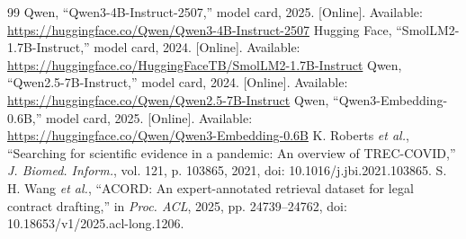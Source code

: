 \documentclass[conference]{IEEEtran}
\begin{document}
\begin{thebibliography}{99}
 Qwen, ``Qwen3-4B-Instruct-2507,'' model card, 2025. [Online]. Available: \url{https://huggingface.co/Qwen/Qwen3-4B-Instruct-2507}
 Hugging Face, ``SmolLM2-1.7B-Instruct,'' model card, 2024. [Online]. Available: \url{https://huggingface.co/HuggingFaceTB/SmolLM2-1.7B-Instruct}
 Qwen, ``Qwen2.5-7B-Instruct,'' model card, 2024. [Online]. Available: \url{https://huggingface.co/Qwen/Qwen2.5-7B-Instruct}
 Qwen, ``Qwen3-Embedding-0.6B,'' model card, 2025. [Online]. Available: \url{https://huggingface.co/Qwen/Qwen3-Embedding-0.6B}
 K. Roberts \emph{et al.}, ``Searching for scientific evidence in a pandemic: An overview of TREC-COVID,'' \emph{J. Biomed. Inform.}, vol. 121, p. 103865, 2021, doi: 10.1016/j.jbi.2021.103865.
 S. H. Wang \emph{et al.}, ``ACORD: An expert-annotated retrieval dataset for legal contract drafting,'' in \emph{Proc. ACL}, 2025, pp. 24739--24762, doi: 10.18653/v1/2025.acl-long.1206.
\end{thebibliography}
\end{document}
